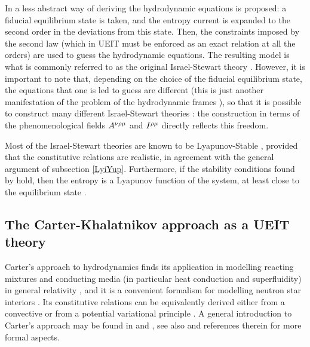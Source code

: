 \documentclass[a4paper, amsfonts, amssymb, amsmath, reprint, twocolumn, showkeys, nofootinbib]{revtex4-2}
\begin{document}
In \citet{Israel_Stewart_1979} a less abstract way of deriving the hydrodynamic equations is proposed: a fiducial equilibrium state is taken, and the entropy current is expanded to the second order in the deviations from this state. Then, the constraints imposed by the second law (which in UEIT must be enforced as an exact relation at all the orders) are used to guess the hydrodynamic equations. The resulting model is what is commonly referred to as the original Israel-Stewart theory \citep{andersson2007review,rezzolla_book}. However, it is important to note that, depending on the choice of the fiducial equilibrium state, the equations that one is led to guess are different (this is just another manifestation of the problem of the hydrodynamic frames \cite{Kovtun2019}), so that  it is possible to construct many different Israel-Stewart theories \citep{Hishcock1983,OlsonLifsh1990}: the construction in terms of the phenomenological fields $A\indices{^\nu ^\rho ^\mu}$ and
$I\indices{^\rho ^\mu}$ directly reflects this freedom.

Most of the Israel-Stewart theories are known to be Lyapunov-Stable \citep{Hishcock1983,OlsonLifsh1990,GerochLindblom1990}, provided that the constitutive relations are realistic, in agreement with the general argument of subsection \ref{LyiYup}. Furthermore, if the stability conditions found by \citet{Hishcock1983} hold, then the entropy is a Lyapunov function of the system, at least close to the equilibrium state  \citep{GavassinoLyapunov_2020}.


\subsection{The Carter-Khalatnikov approach as a UEIT theory}

Carter's   approach to hydrodynamics finds its application in modelling reacting mixtures and conducting media (in particular heat conduction and superfluidity) in general relativity \citep{noto_rel}, and it is a convenient formalism for modelling neutron star interiors \citep{haskellsedrakian2017,chamel_super}.  Its constitutive relations can be equivalently derived either from a convective or from a potential variational principle \cite{Carter_starting_point}. 
A general introduction to Carter's approach may be found in  \citet{Carter_starting_point} and \citet{andersson2007review}, see also \citet{Termo} and references therein for more formal aspects.  
\end{document}
